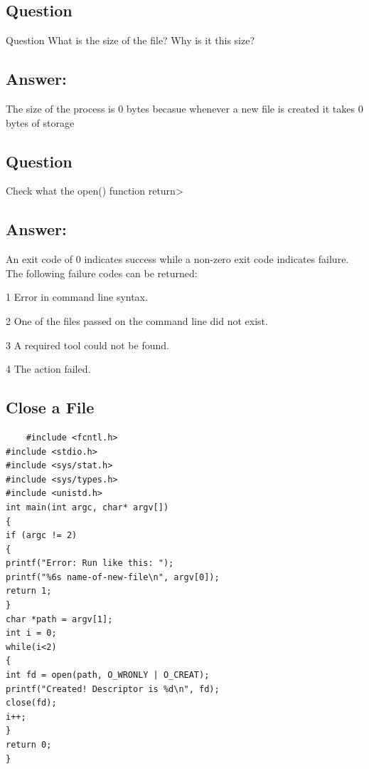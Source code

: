 \documentclass[12pt]{article}
\begin{document}
\subsection{Question}
Question What is the size of the file? Why
is it this size?
\subsection{Answer:}
The size of the process is 0 bytes becasue whenever a new file is created it takes 0 bytes of storage

\subsection{Question}
Check what the open() function return> 
\subsection{Answer:}
An exit code of 0 indicates success while a non-zero exit code
       indicates failure. The following failure codes can be returned:

       1
           Error in command line syntax.

       2
           One of the files passed on the command line did not exist.

       3
           A required tool could not be found.

       4
           The action failed.

\subsection{Close a File}
\begin{verbatim}
    #include <fcntl.h>
#include <stdio.h>
#include <sys/stat.h>
#include <sys/types.h>
#include <unistd.h>
int main(int argc, char* argv[])
{
if (argc != 2)
{
printf("Error: Run like this: ");
printf("%6s name-of-new-file\n", argv[0]);
return 1;
}
char *path = argv[1];
int i = 0;
while(i<2)
{
int fd = open(path, O_WRONLY | O_CREAT);
printf("Created! Descriptor is %d\n", fd);
close(fd);
i++;
}
return 0;
}
\end{verbatim}
\end{document}
